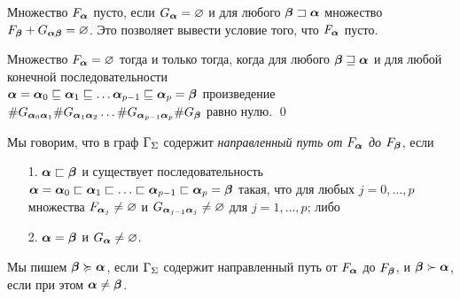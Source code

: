 Множество $F_{\bm{\alpha}}$ пусто, если $G_{\bm{\alpha}}=\varnothing$ и для любого ${\bm{\beta}}\sqsupset{\bm{\alpha}}$ множество $F_{\bm{\beta}}+G_{{\bm{\alpha}}{\bm{\beta}}}=\varnothing$.
Это позволяет вывести условие того, что $F_{\bm{\alpha}}$ пусто.

\begin{lemma}
Множество $F_{\bm{\alpha}}=\varnothing$ тогда и только тогда, когда для любого ${\bm{\beta}}\sqsupseteq{\bm{\alpha}}$ и для любой конечной последовательности\\ ${\bm{\alpha}}={\bm{\alpha}}_0\sqsubseteq{\bm{\alpha}}_1\sqsubseteq\ldots {\bm{\alpha}}_{p-1}\sqsubseteq{\bm{\alpha}}_p={\bm{\beta}}$ произведение 
$\#G_{{\bm{\alpha}}_0{\bm{\alpha}}_1}\#G_{{\bm{\alpha}}_1{\bm{\alpha}}_2}\ldots  \#G_{{\bm{\alpha}}_{p-1}{\bm{\alpha}}_p}\#G_{{\bm{\beta}}}$ равно нулю. 
\qed
\end{lemma} 

\begin{definition}
Мы говорим, что в граф $\Gamma_\Sigma$  содержит  {\em направленный путь от $F_{\bm{\alpha}}$ до $F_{\bm{\beta}}$}, если 
\begin{itemize}[nolistsep]
\item[1.] ${\bm{\alpha}}\sqsubset{\bm{\beta}}$ и существует последовательность ${\bm{\alpha}}={\bm{\alpha}}_0\sqsubset{\bm{\alpha}}_1\sqsubset\ldots\sqsubset{\bm{\alpha}}_{p-1}\sqsubset{\bm{\alpha}}_p={\bm{\beta}}$ такая, что для любых  $j=0, \ldots, p$ множества $F_{{\bm{\alpha}}_j}\neq\varnothing$  и  $G_{{\bm{\alpha}}_{j-1}{\bm{\alpha}}_j}\neq\varnothing$ для $j=1, \ldots, p$; либо
\item[2.] ${\bm{\alpha}}={\bm{\beta}}$ и  $G_{{\bm{\alpha}}}\neq\varnothing$.
\end{itemize}
 Мы пишем ${\bm{\beta}}\succcurlyeq{\bm{\alpha}}$, если  $\Gamma_\Sigma$ содержит направленный путь от $F_{\bm{\alpha}}$ до $F_{\bm{\beta}}$, и ${\bm{\beta}}\succ{\bm{\alpha}}$, 
если при этом ${\bm{\alpha}}\neq{\bm{\beta}}$.
\end{definition}
 
%
%


